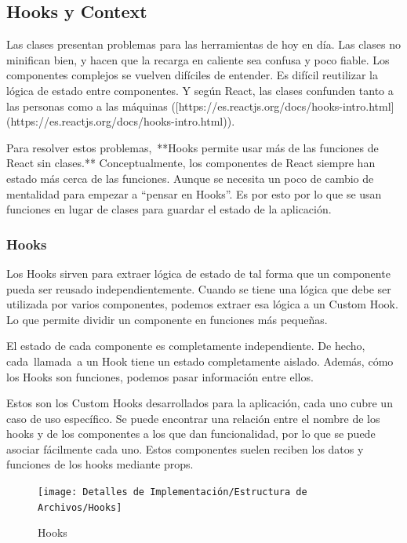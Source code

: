 \documentclass[12pt,twoside,titlepage]{report}
\begin{document}
\subsection{Hooks y Context}

Las clases presentan problemas para las herramientas de hoy en día. Las clases no minifican bien, y hacen que la recarga en caliente sea confusa y poco fiable. Los componentes complejos se vuelven difíciles de entender. Es difícil reutilizar la lógica de estado entre componentes. Y según React, las clases confunden tanto a las personas como a las máquinas ([https://es.reactjs.org/docs/hooks-intro.html](https://es.reactjs.org/docs/hooks-intro.html)).

Para resolver estos problemas, **Hooks permite usar más de las funciones de React sin clases.** Conceptualmente, los componentes de React siempre han estado más cerca de las funciones. Aunque se necesita un poco de cambio de mentalidad para empezar a “pensar en Hooks”. Es por esto por lo que se usan funciones en lugar de clases para guardar el estado de la aplicación.

\subsubsection{Hooks}

Los Hooks sirven para extraer lógica de estado de tal forma que un componente pueda ser reusado independientemente. Cuando se tiene una lógica que debe ser utilizada por varios componentes, podemos extraer esa lógica a un Custom Hook. Lo que permite dividir un componente en funciones más pequeñas.

El estado de cada componente es completamente independiente. De hecho, cada llamada a un Hook tiene un estado completamente aislado. Además, cómo los Hooks son funciones, podemos pasar información entre ellos.

Estos son los Custom Hooks desarrollados para la aplicación, cada uno cubre un caso de uso específico. Se puede encontrar una relación entre el nombre de los hooks y de los componentes a los que dan funcionalidad, por lo que se puede asociar fácilmente cada uno. Estos componentes suelen reciben los datos y funciones de los hooks mediante props.

\begin{figure}[H]
    \centering
    \texttt{[image: Detalles de Implementación/Estructura de Archivos/Hooks]}
    \label{fig:Hooks}
    \caption{Hooks}
\end{figure}
\end{document}
